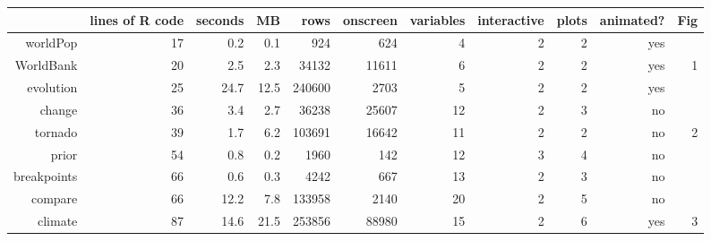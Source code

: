 \begin{tabular}{rrrrrrrrrrr}
  \hline
 & lines of R code & seconds & MB & rows & onscreen & variables & interactive & plots & animated? & Fig \\ 
  \hline
worldPop & 17 & 0.2 & 0.1 & 924 & 624 &  4 &  2 &  2 & yes &  \\ 
  WorldBank & 20 & 2.5 & 2.3 & 34132 & 11611 &  6 &  2 &  2 & yes &  1 \\ 
  evolution & 25 & 24.7 & 12.5 & 240600 & 2703 &  5 &  2 &  2 & yes &  \\ 
  change & 36 & 3.4 & 2.7 & 36238 & 25607 & 12 &  2 &  3 & no &  \\ 
  tornado & 39 & 1.7 & 6.2 & 103691 & 16642 & 11 &  2 &  2 & no &  2 \\ 
  prior & 54 & 0.8 & 0.2 & 1960 & 142 & 12 &  3 &  4 & no &  \\ 
  breakpoints & 66 & 0.6 & 0.3 & 4242 & 667 & 13 &  2 &  3 & no &  \\ 
  compare & 66 & 12.2 & 7.8 & 133958 & 2140 & 20 &  2 &  5 & no &  \\ 
  climate & 87 & 14.6 & 21.5 & 253856 & 88980 & 15 &  2 &  6 & yes &  3 \\ 
   \hline
\end{tabular}
